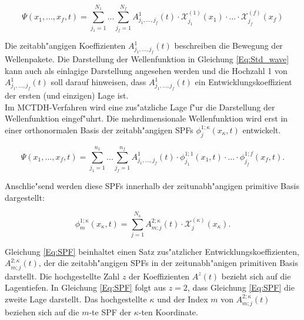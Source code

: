  \begin{equation}
 \Psi(x_{1},..., x_{f}, t)=\sum^{N_{1}}_{j_{1}=1} ... \sum^{N_{f}}_{j_{f}=1} A^{1}_{j_{1}, ..., j_{f}}(t)\cdot \mathcal{X}^{(1)}_{j_{1}}(x_{1}) \cdot ... \cdot \mathcal{X}^{(f)}_{j_{f}}(x_{f})
 \label{Eq:Std_wave}
 \end{equation}

Die zeitabh"angigen Koeffizienten $A^{1}_{j_{1}, ..., j_{f}}(t)$ beschreiben die Bewegung der Wellenpakete.
Die Darstellung der Wellenfunktion in Gleichung  \ref{Eq:Std_wave} kann auch als einlagige Darstellung angesehen werden
und die Hochzahl 1 von $A^{1}_{j_{1}, ..., j_{f}}(t)$ soll darauf hinweisen, dass $A^{1}_{j_{1}, ..., j_{f}}(t)$ ein Entwicklungskoeffizient
der ersten (und einzigen) Lage ist.
\\Im MCTDH-Verfahren wird eine zus"atzliche Lage f"ur die Darstellung der Wellenfunktion eingef"uhrt.
Die mehrdimensionale Wellenfunktion wird erst in einer orthonormalen Basis der zeitabh"angigen SPFs $\phi^{1;\kappa}_{j}(x_{\kappa},t)$
entwickelt.


 \begin{equation}
 \Psi(x_{1},..., x_{f}, t)=\sum^{n_{1}}_{j_{1}=1} ... \sum^{n_{f}}_{j_{f}=1} A^{1}_{j_{1}, ..., j_{f}}(t)
 \cdot \phi^{1;1}_{j_{1}}(x_{1}, t) \cdot ... \cdot \phi^{1;f}_{j_{f}}(x_{f}, t).
 \label{Eq:mctdh_wave}
 \end{equation}

Anschlie"send werden diese SPFs innerhalb der zeitunabh"angigen primitive Basis darge\-stellt: 

\begin{equation}
 \phi^{1;\kappa}_{m} (x_{\kappa}, t)=\sum^{N_{\kappa}}_{j=1} A^{2;\kappa}_{m;j}(t) \cdot \mathcal{X}^{(\kappa)}_{j}(x_{\kappa}).
 \label{Eq:SPF}
 \end{equation}

Gleichung \ref{Eq:SPF} beinhaltet einen Satz zus"atzlicher Entwicklungskoeffizienten, $ A^{2;\kappa}_{m;j}(t) $, der die zeitabh"angigen SPFs
in der zeitunabh"anigen primitiven Basis darstellt.
Die hochgestellte Zahl $z$ der Koeffizienten $A^{z}(t)$ bezieht sich auf die Lagentiefen.
In Glei\-chung \ref{Eq:SPF} folgt aus $z=2$, dass Gleichung \ref{Eq:SPF} die zweite Lage darstellt.
Das hochgestellte $\kappa$ und der Index $m$ von $A^{2;\kappa}_{m;j}(t)$ beziehen sich auf die $m$-te SPF der $\kappa$-ten Koordinate.

